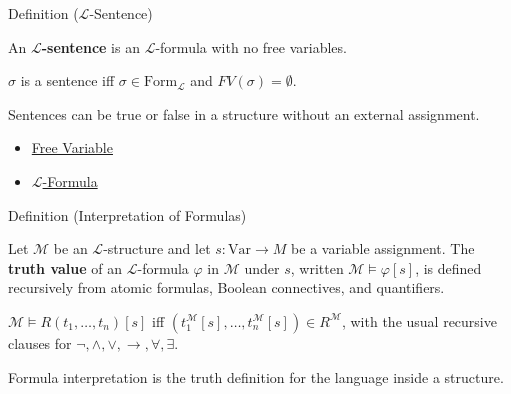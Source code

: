 \begin{definitionbox}{Definition ($\mathcal{L}$-Sentence)}
\begin{definition}\label{def:l-sentence}
An \textbf{$\mathcal{L}$-sentence} is an $\mathcal{L}$-formula with no free
variables.
\end{definition}
\end{definitionbox}

\begin{remark*}
$\sigma$ is a sentence iff $\sigma\in\mathrm{Form}_{\mathcal{L}}$ and
$FV(\sigma)=\emptyset$.
\end{remark*}

\begin{remark*}[Interpretation]
Sentences can be true or false in a structure without an external assignment.
\end{remark*}

\begin{dependencies}
\begin{itemize}
  \item \hyperref[def:free-variable]{Free Variable}
  \item \hyperref[def:l-formula]{$\mathcal{L}$-Formula}
\end{itemize}
\end{dependencies}

\begin{definitionbox}{Definition (Interpretation of Formulas)}
\begin{definition}\label{def:formula-interpretation}
Let $\mathcal{M}$ be an $\mathcal{L}$-structure and let
$s\colon\mathrm{Var}\to M$ be a variable assignment. The
\textbf{truth value} of an $\mathcal{L}$-formula $\varphi$ in
$\mathcal{M}$ under $s$, written $\mathcal{M}\models\varphi[s]$, is defined
recursively from atomic formulas, Boolean connectives, and quantifiers.
\end{definition}
\end{definitionbox}

\begin{remark*}
$\mathcal{M}\models R(t_1,\ldots,t_n)[s]$ iff
$(t_1^{\mathcal{M}}[s],\ldots,t_n^{\mathcal{M}}[s])\in R^{\mathcal{M}}$, with
the usual recursive clauses for $\lnot,\land,\lor,\to,\forall,\exists$.
\end{remark*}

\begin{remark*}[Interpretation]
Formula interpretation is the truth definition for the language inside a
structure.
\end{remark*}

